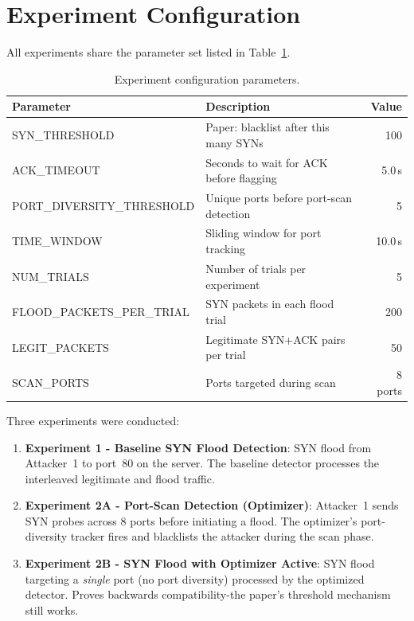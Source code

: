 \documentclass[12pt, a4paper]{article}
\begin{document}
\newpage

\section{Experiment Configuration}

All experiments share the parameter set listed in Table~\ref{tab:config}.

\begin{table}[H]
    \centering
    \caption{Experiment configuration parameters.}
    \label{tab:config}
    \renewcommand{\arraystretch}{1.3}
    \begin{tabularx}{\textwidth}{lXr}
        \toprule
        \textbf{Parameter} & \textbf{Description} & \textbf{Value} \\
        \midrule
        SYN\_THRESHOLD           & Paper: blacklist after this many SYNs     & 100 \\
        ACK\_TIMEOUT             & Seconds to wait for ACK before flagging   & 5.0\,s \\
        PORT\_DIVERSITY\_THRESHOLD & Unique ports before port-scan detection  & 5 \\
        TIME\_WINDOW             & Sliding window for port tracking          & 10.0\,s \\
        NUM\_TRIALS              & Number of trials per experiment           & 5 \\
        FLOOD\_PACKETS\_PER\_TRIAL & SYN packets in each flood trial         & 200 \\
        LEGIT\_PACKETS           & Legitimate SYN+ACK pairs per trial        & 50 \\
        SCAN\_PORTS              & Ports targeted during scan                & 8 ports \\
        \bottomrule
    \end{tabularx}
\end{table}

Three experiments were conducted:

\begin{enumerate}[itemsep=3pt]
    \item \textbf{Experiment 1 - Baseline SYN Flood Detection}: SYN flood from Attacker~1 to port~80 on the server. The baseline detector processes the interleaved legitimate and flood traffic.
    \item \textbf{Experiment 2A - Port-Scan Detection (Optimizer)}: Attacker~1 sends SYN probes across 8 ports before initiating a flood. The optimizer's port-diversity tracker fires and blacklists the attacker during the scan phase.
    \item \textbf{Experiment 2B - SYN Flood with Optimizer Active}: SYN flood targeting a \textit{single} port (no port diversity) processed by the optimized detector. Proves backwards compatibility-the paper's threshold mechanism still works.
\end{enumerate}
\end{document}
